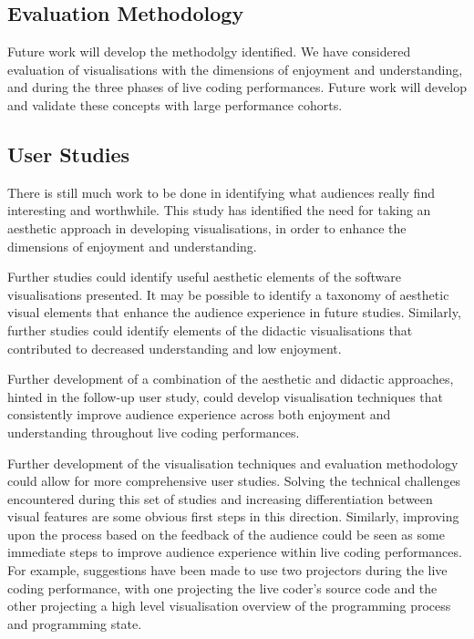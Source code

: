 \subsection{Evaluation Methodology}

Future work will develop the methodolgy identified. We have considered evaluation of visualisations with the dimensions of  enjoyment and understanding, and during the three phases of live coding performances. Future work will develop and validate these concepts with large performance cohorts.

\subsection{User Studies}

There is still much work to be done in identifying what audiences really find interesting and worthwhile. This study has identified the need for taking an aesthetic approach in developing visualisations, in order to enhance the dimensions of enjoyment and understanding.

Further studies could identify useful aesthetic elements of the software visualisations presented. It may be possible to identify a taxonomy of aesthetic visual elements that enhance the audience experience in future studies. Similarly, further studies could identify elements of the didactic visualisations that contributed to decreased understanding and low enjoyment.

Further development of a combination of the aesthetic and didactic approaches, hinted in the follow-up user study, could develop visualisation techniques that consistently improve audience experience across both enjoyment and understanding throughout live coding performances.

Further development of the visualisation techniques and evaluation methodology could allow for more comprehensive user studies. Solving the technical challenges encountered during this set of studies and increasing differentiation between visual features are some obvious first steps in this direction. Similarly, improving upon the process based on the feedback of the audience could be seen as some immediate steps to improve audience experience within live coding performances. For example, suggestions have been made to use two projectors during the live coding performance, with one projecting the live coder's source code and the other projecting a high level visualisation overview of the programming process and programming state.

